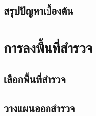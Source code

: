 \subsection{สรุปปัญหาเบื้องต้น}

\section{การลงพื้นที่สำรวจ}

\subsection{เลือกพี้นที่สำรวจ}

\subsection{วางแผนออกสำรวจ}


